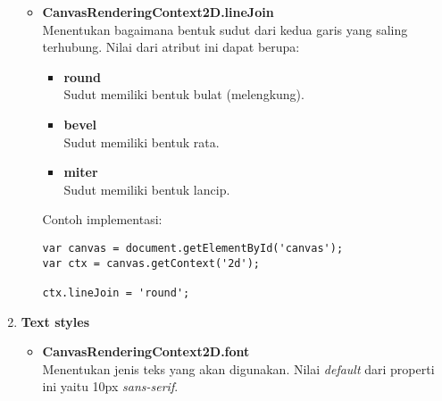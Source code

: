 \begin{enumerate}
\begin{itemize}
		\item \textbf{CanvasRenderingContext2D.lineJoin} \\ Menentukan bagaimana bentuk sudut dari kedua garis yang saling terhubung. Nilai dari atribut ini dapat berupa:
		\begin{itemize}
			\item \textbf{round} \\ Sudut memiliki bentuk bulat (melengkung).
			\item \textbf{bevel} \\ Sudut memiliki bentuk rata.
			\item \textbf{miter} \\ Sudut memiliki bentuk lancip.
		\end{itemize}
		Contoh implementasi:
\begin{lstlisting}
var canvas = document.getElementById('canvas');
var ctx = canvas.getContext('2d');
		
ctx.lineJoin = 'round';
\end{lstlisting}
	\end{itemize}

	\item \textbf{Text styles} 
	\begin{itemize}
		\item \textbf{CanvasRenderingContext2D.font} \\ Menentukan jenis teks yang akan digunakan. Nilai \textit{default} dari properti ini yaitu 10px \textit{sans-serif}.
	\end{itemize}
	
\end{enumerate}

